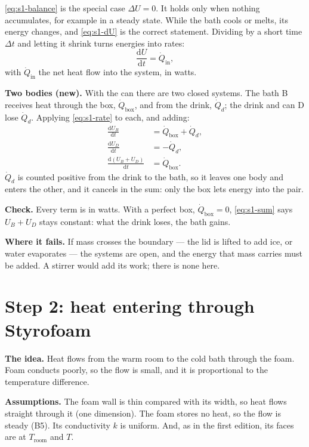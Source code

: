 \documentclass[11pt,a4paper]{article}
\newcommand{\dd}{\mathrm{d}}
\newcommand{\Troom}{T_{\mathrm{room}}}
\newcommand{\para}[1]{\par\smallskip\noindent\textbf{#1}\enspace}
\begin{document}
\eqref{eq:s1-balance} is the special case $\Delta U = 0$. It holds only when nothing accumulates, for
example in a steady state. While the bath cools or melts, its energy changes, and \eqref{eq:s1-dU} is the
correct statement. Dividing by a short time $\Delta t$ and letting it shrink turns energies into rates:
\begin{equation}
\frac{\dd U}{\dd t} = \dot Q_{\mathrm{in}}, \label{eq:s1-rate}
\end{equation}
with $\dot Q_{\mathrm{in}}$ the net heat flow into the system, in watts.

\para{Two bodies (new).} With the can there are two closed systems. The bath B receives heat through the
box, $\dot Q_{\mathrm{box}}$, and from the drink, $\dot Q_d$; the drink and can D lose $\dot Q_d$. Applying
\eqref{eq:s1-rate} to each, and adding:
\begin{align}
\frac{\dd U_B}{\dd t} &= \dot Q_{\mathrm{box}} + \dot Q_d, \label{eq:s1-bath}\\
\frac{\dd U_D}{\dd t} &= -\dot Q_d, \label{eq:s1-drink}\\
\frac{\dd (U_B + U_D)}{\dd t} &= \dot Q_{\mathrm{box}}. \label{eq:s1-sum}
\end{align}
$\dot Q_d$ is counted positive from the drink to the bath, so it leaves one body and enters the other, and
it cancels in the sum: only the box lets energy into the pair.

\para{Check.} Every term is in watts. With a perfect box, $\dot Q_{\mathrm{box}} = 0$, \eqref{eq:s1-sum}
says $U_B + U_D$ stays constant: what the drink loses, the bath gains.

\para{Where it fails.} If mass crosses the boundary --- the lid is lifted to add ice, or water
evaporates --- the systems are open, and the energy that mass carries must be added. A stirrer would add
its work; there is none here.

\section{Step 2: heat entering through Styrofoam}\label{sec:s2}

\para{The idea.} Heat flows from the warm room to the cold bath through the foam. Foam conducts poorly, so
the flow is small, and it is proportional to the temperature difference.

\para{Assumptions.} The foam wall is thin compared with its width, so heat flows straight through it (one
dimension). The foam stores no heat, so the flow is steady (B5). Its conductivity $k$ is uniform. And, as
in the first edition, its faces are at $\Troom$ and $T$.
\end{document}

